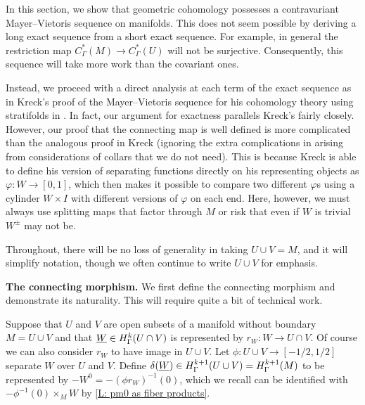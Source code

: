 In this section, we show that geometric cohomology possesses a contravariant Mayer--Vietoris sequence on manifolds.
This does not seem possible by deriving a long exact sequence from a short exact sequence.
For example, in general the restriction map $C^*_\Gamma(M) \to C^*_\Gamma(U)$ will not be surjective.
Consequently, this sequence will take more work than the covariant ones.

Instead, we proceed with a direct analysis at each term of the exact sequence as in Kreck's proof of the Mayer--Vietoris sequence for his cohomology theory using stratifolds in \cite{Krec10}.
In fact, our argument for exactness parallels Kreck's fairly closely.
However, our proof that the connecting map is well defined is more complicated than the analogous proof in Kreck (ignoring the extra complications in \cite{Krec10} arising from considerations of collars that we do not need).
This is because Kreck is able to define his version of separating functions directly on his representing objects as $\varphi \colon W \to [0,1]$, which then makes it possible to compare two different $\varphi$s using a cylinder $W \times I$ with different versions of $\varphi$ on each end.
Here, however, we must always use splitting maps that factor through $M$ or risk that even if $W$ is trivial $W^{\pm}$ may not be.

Throughout, there will be no loss of generality in taking $U \cup V = M$, and it will simplify notation, though we often continue to write $U \cup V$ for emphasis.

\medskip
\noindent\textbf{The connecting morphism.} We first define the connecting morphism and demonstrate its naturality.
This will require quite a bit of technical work.

\begin{definition}\label{D: connecting}
	Suppose that $U$ and $V$ are open subsets of a manifold without boundary $M = U \cup V$ and that $\underline{W} \in H^k_\Gamma(U \cap V)$ is represented by $r_W \colon W \to U \cap V$.
	Of course we can also consider $r_W$ to have image in $U \cup V$.
	Let $\phi \colon U \cup V \to [-1/2,1/2]$ separate $W$ over $U$ and $V$.
	Define $\delta(\underline{W}) \in H^{k+1}_\Gamma(U \cup V) = H^{k+1}_\Gamma(M)$ to be represented by $-W^0 = -(\phi r_W)^{-1}(0)$, which we recall can be identified with $-\phi^{-1}(0)\times_M W$ by \cref{L: pm0 as fiber products}.
\end{definition}

